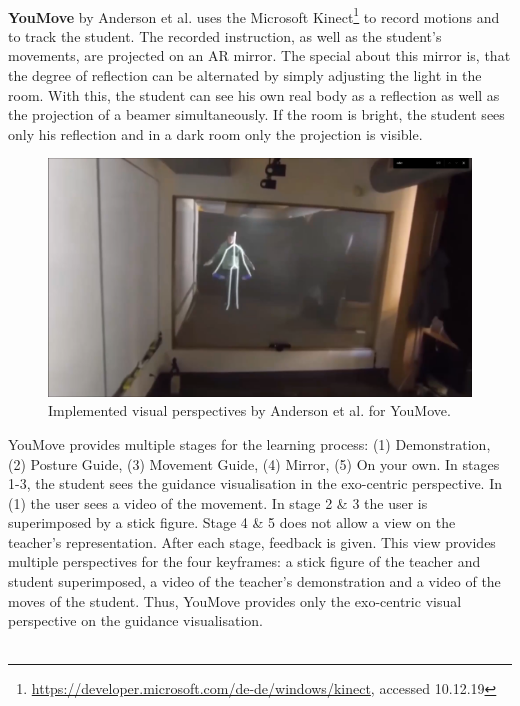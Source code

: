 $ $\\
\textbf{YouMove} by Anderson et al. \cite{Anderson2013a} uses the Microsoft Kinect\footnote{\hyperlink{https://developer.microsoft.com/de-de/windows/kinect}{https://developer.microsoft.com/de-de/windows/kinect}, accessed 10.12.19} to record motions and to track the student. The recorded instruction, as well as the student's movements, are projected on an AR mirror. The special about this mirror is, that the degree of reflection can be alternated by simply adjusting the light in the room. With this, the student can see his own real body as a reflection as well as the projection of a beamer simultaneously. If the room is bright, the student sees only his reflection and in a dark room only the projection is visible.\\ 
\begin{figure}[h!]
	\centering
	\includegraphics[width=1.0\textwidth]{img/YouMove.png}
	\caption{Implemented visual perspectives by Anderson et al. \cite{Anderson2013a} for YouMove.}
	\label{fig:youmovePerspectives}
\end{figure}
YouMove provides multiple stages for the learning process: (1) Demonstration, (2) Posture Guide, (3) Movement Guide, (4) Mirror, (5) On your own. In stages 1-3, the student sees the guidance visualisation in the exo-centric perspective. In (1) the user sees a video of the movement. In stage 2 \& 3 the user is superimposed by a stick figure. Stage 4 \& 5 does not allow a view on the teacher's representation. After each stage, feedback is given. This view provides multiple perspectives for the four keyframes: a stick figure of the teacher and student superimposed, a video of the teacher's demonstration and a video of the moves of the student. Thus, YouMove provides only the exo-centric visual perspective on the guidance visualisation.\\ \\
